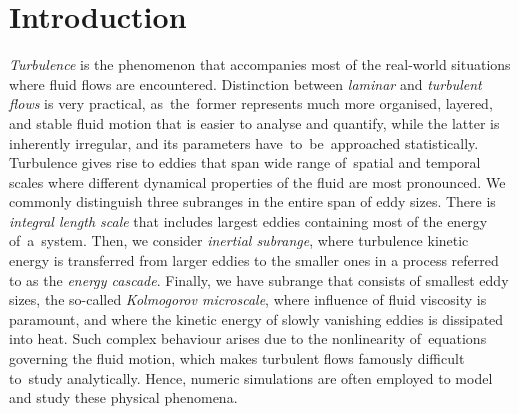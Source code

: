 \documentclass{pracamgren}
\begin{document}
\chapter*{Introduction}
\label{ch:int}


\emph{Turbulence} is the phenomenon that accompanies most of the real-world situations where fluid flows are encountered.
Distinction between \emph{laminar} and \emph{turbulent flows} is very practical, as~the~former represents much more organised, layered, and stable fluid motion that is easier to analyse and quantify, while the latter is inherently irregular, and its parameters have~to~be~approached statistically.
Turbulence gives rise to eddies that span wide range of~spatial and temporal scales where different dynamical properties of the fluid are most pronounced.
We commonly distinguish three subranges in the entire span of eddy sizes.
There is \emph{integral length scale} that includes largest eddies containing most of the energy of~a~system.
Then, we consider \emph{inertial subrange}, where turbulence kinetic energy is transferred from larger eddies to the smaller ones in a process referred to as the \emph{energy cascade}.
Finally, we have subrange that consists of smallest eddy sizes, the so-called \emph{Kolmogorov microscale}, where influence of fluid viscosity is paramount, and where the kinetic energy of slowly vanishing eddies is dissipated into heat.
Such complex behaviour arises due to the nonlinearity of~equations governing the fluid motion, which makes turbulent flows famously difficult to~study analytically.
Hence, numeric simulations are often employed to model and study these physical phenomena.
\end{document}
